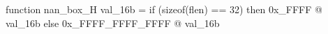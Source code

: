 function nan_box_H   val_16b =
  if (sizeof(flen) == 32)
  then 0x_FFFF @ val_16b
  else 0x_FFFF_FFFF_FFFF @ val_16b
